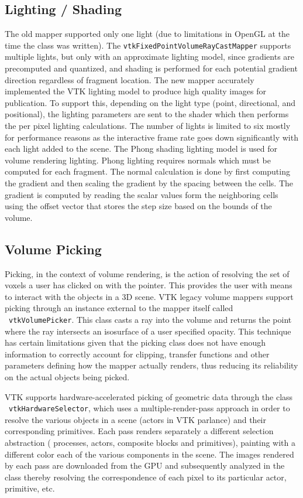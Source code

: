 \subsection{Lighting / Shading}
The old mapper supported only one light (due to limitations in OpenGL at the
time the class was written). The \texttt{vtkFixedPointVolumeRayCastMapper}
supports multiple lights, but only with an approximate lighting model, since
gradients are precomputed and quantized, and shading is performed for each
potential gradient direction regardless of fragment location. The new mapper
accurately implemented the VTK lighting model to produce high quality images for
publication. To support this, depending on the light type (point, directional,
and positional), the lighting parameters are sent to the shader which then
performs the per pixel lighting calculations. The number of lights is limited to
six mostly for performance reasons as the interactive frame rate goes down
significantly with each light added to the scene. The Phong shading lighting
model is used for volume rendering lighting. Phong lighting requires normals
which must be computed for each fragment. The normal calculation is done by
first computing the gradient and then scaling the gradient by the spacing
between the cells. The gradient is computed by reading the scalar values form
the neighboring cells using the offset vector that stores the step size based
on the bounds of the volume.

\subsection{Volume Picking}
Picking, in the context of volume rendering, is the action of resolving the set
of voxels a user has clicked on with the pointer. This provides the user with
means to interact with the objects in a 3D scene. VTK legacy volume mappers
support picking through an instance external to the mapper itself called
~\texttt{vtkVolumePicker}.  This class casts a ray into the volume and returns
the point where the ray intersects an isosurface of a user specified opacity.
This technique has certain limitations given that the picking class does not
have enough information to correctly account for clipping, transfer functions
and other parameters defining how the mapper actually renders, thus reducing its
reliability on the actual objects being picked.

VTK supports hardware-accelerated picking of geometric data through the class
~\texttt{vtkHardwareSelector}, which uses a multiple-render-pass approach in
order to resolve the various objects in a scene (actors in VTK parlance) and
their corresponding primitives.  Each pass renders separately a different
selection abstraction ( processes, actors, composite blocks and primitives),
painting with a different color each of the various components in the scene.
The images rendered by each pass are downloaded from the GPU and subsequently
analyzed in the class thereby resolving the correspondence of each pixel to its
particular actor, primitive, etc.

